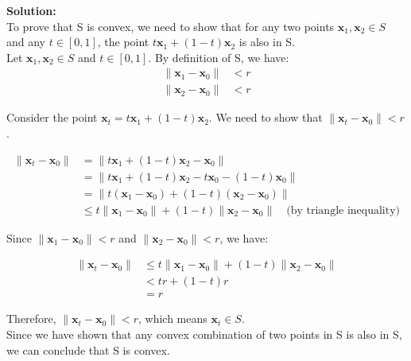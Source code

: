 \documentclass{article}
\begin{document}
\textbf{Solution: } \\

To prove that S is convex, we need to show that for any two points $\mathbf{x}_1, \mathbf{x}_2 \in S$ and any $t \in [0,1]$, the point $t\mathbf{x}_1 + (1-t)\mathbf{x}_2$ is also in S. \\

Let $\mathbf{x}_1, \mathbf{x}_2 \in S$ and $t \in [0,1]$. By definition of S, we have:
\begin{align*}
\|\mathbf{x}_1 - \mathbf{x}_0\| &< r \\
\|\mathbf{x}_2 - \mathbf{x}_0\| &< r
\end{align*}

Consider the point $\mathbf{x}_t = t\mathbf{x}_1 + (1-t)\mathbf{x}_2$. We need to show that $\|\mathbf{x}_t - \mathbf{x}_0\| < r$.

\begin{align*}
\|\mathbf{x}_t - \mathbf{x}_0\| &= \|t\mathbf{x}_1 + (1-t)\mathbf{x}_2 - \mathbf{x}_0\| \\
&= \|t\mathbf{x}_1 + (1-t)\mathbf{x}_2 - t\mathbf{x}_0 - (1-t)\mathbf{x}_0\| \\
&= \|t(\mathbf{x}_1 - \mathbf{x}_0) + (1-t)(\mathbf{x}_2 - \mathbf{x}_0)\| \\
&\leq t\|\mathbf{x}_1 - \mathbf{x}_0\| + (1-t)\|\mathbf{x}_2 - \mathbf{x}_0\| \quad \text{(by triangle inequality)}
\end{align*}

Since $\|\mathbf{x}_1 - \mathbf{x}_0\| < r$ and $\|\mathbf{x}_2 - \mathbf{x}_0\| < r$, we have:

\begin{align*}
\|\mathbf{x}_t - \mathbf{x}_0\| &\leq t\|\mathbf{x}_1 - \mathbf{x}_0\| + (1-t)\|\mathbf{x}_2 - \mathbf{x}_0\| \\
&< tr + (1-t)r \\
&= r
\end{align*}

Therefore, $\|\mathbf{x}_t - \mathbf{x}_0\| < r$, which means $\mathbf{x}_t \in S$. \\

Since we have shown that any convex combination of two points in S is also in S, we can conclude that S is convex.

\newpage
\end{document}
